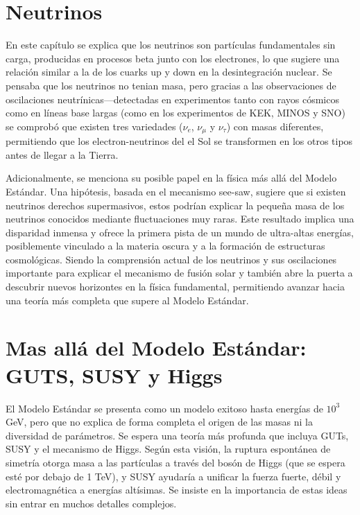 \documentclass[12pt]{article}
\begin{document}
\section{Neutrinos}

En este capítulo se explica que los neutrinos son partículas fundamentales sin carga, producidas en procesos beta junto con los electrones, lo que sugiere una relación similar a la de los cuarks up y down en la desintegración nuclear. Se pensaba que los neutrinos no tenian masa, pero gracias a las observaciones de oscilaciones neutrínicas—detectadas en experimentos tanto con rayos cósmicos como en líneas base largas (como en los experimentos de KEK, MINOS y SNO) se comprobó que existen tres variedades ($\nu_{e}$, $\nu_{\mu}$ y $\nu_{\tau}$) con masas diferentes, permitiendo que los electron-neutrinos del el Sol se transformen en los otros tipos antes de llegar a la Tierra. 

Adicionalmente, se menciona su posible papel en la física más allá del Modelo Estándar. Una hipótesis, basada en el mecanismo see-saw, sugiere que si existen neutrinos derechos supermasivos, estos podrían explicar la pequeña masa de los neutrinos conocidos mediante fluctuaciones muy raras. Este resultado implica una disparidad inmensa y ofrece la primera pista de un mundo de ultra-altas energías, posiblemente vinculado a la materia oscura y a la formación de estructuras cosmológicas. Siendo la comprensión actual de los neutrinos y sus oscilaciones importante para explicar el mecanismo de fusión solar y también abre la puerta a descubrir nuevos horizontes en la física fundamental, permitiendo avanzar hacia una teoría más completa que supere al Modelo Estándar.

\section{Mas allá del Modelo Estándar: GUTS, SUSY y Higgs}
El Modelo Estándar se presenta como un modelo exitoso hasta energías de $10^{3}$ GeV, pero que no explica de forma completa el origen de las masas ni la diversidad de parámetros. Se espera una teoría más profunda que incluya GUTs, SUSY y el mecanismo de Higgs. Según esta visión, la ruptura espontánea de simetría otorga masa a las partículas a través del bosón de Higgs (que se espera esté por debajo de 1 TeV), y SUSY ayudaría a unificar la fuerza fuerte, débil y electromagnética a energías altísimas. Se insiste en la importancia de estas ideas sin entrar en muchos detalles complejos.
\end{document}
